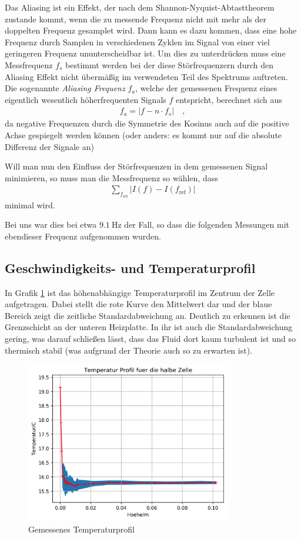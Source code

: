 \documentclass[12pt,a4paper,titlepage,headinclude]{scrartcl}
\numberwithin{equation}{subsection}
\begin{document}
Das Aliasing ist ein Effekt, der nach dem Shannon-Nyquist-Abtasttheorem zustande kommt, wenn die zu messende Frequenz nicht mit mehr als der doppelten Frequenz gesamplet wird.
Dann kann es dazu kommen, dass eine hohe Frequenz durch Samplen in verschiedenen Zyklen im Signal von einer viel geringeren Frequenz ununterscheidbar ist.
Um dies zu unterdrücken muss eine Messfrequenz $f_s$ bestimmt werden bei der diese Störfrequenzern durch den Aliasing Effekt nicht übermäßig im verwendeten Teil des Spektrums auftreten.
Die sogenannte \textit{Aliasing Frequenz} $f_a$, welche der gemessenen Frequenz eines eigentlich wesentlich höherfrequenten Signals $f$ entspricht, berechnet sich aus
\begin{align}
  f_a=|f-n\cdot f_s|\quad,
  \label{eq:stoerfreq}
\end{align}
da negative Frequenzen durch die Symmetrie des Kosinus auch auf die positive Achse gespiegelt werden können (oder anders: es kommt nur auf die absolute Differenz der Signale an)

Will man nun den Einfluss der Störfrequenzen in dem gemessenen Signal minimieren, so muss man die Messfrequenz so wählen, dass
\begin{align}
  \sum_{f_\text{ref}} |I(f)-I(f_\text{ref})|
\end{align}
minimal wird.

Bei uns war dies bei etwa $\SI{9.1}\hertz$ der Fall, so dass die folgenden Messungen mit ebendieser Frequenz aufgenommen wurden.

\subsection{Geschwindigkeits- und Temperaturprofil}
\label{sec:profile}
In Grafik \ref{fig:T_fahrt} ist das höhenabhängige Temperaturprofil im Zentrum der Zelle aufgetragen.
Dabei stellt die rote Kurve den Mittelwert dar und der blaue Bereich zeigt die zeitliche Standardabweichung an.
Deutlich zu erkennen ist die Grenzschicht an der unteren Heizplatte.
In ihr ist auch die Standardabweichung gering, was darauf schließen lässt, dass das Fluid dort kaum turbulent ist und so thermisch stabil (was aufgrund der Theorie auch so zu erwarten ist).
\begin{figure}[!ht]
\centering
\includegraphics[width=0.8\textwidth]{T_fahrt.png}
\caption{Gemessenes Temperaturprofil}
\label{fig:T_fahrt}
\end{figure}
\end{document}
